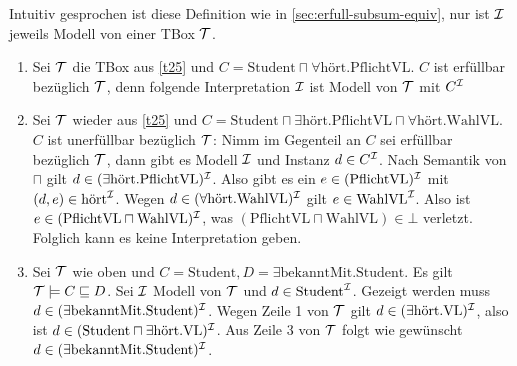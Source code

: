 Intuitiv gesprochen ist diese Definition wie in
\autoref{sec:erfull-subsum-equiv}, nur ist $\mathcal{I}$ jeweils Modell von einer TBox
$\mathcal{T}$.

\begin{tafel}\mbox{}
    \begin{enumerate}[label=\alph*)]
    \item Sei $\mathcal{T}$ die TBox aus \autoref{t25} und $C = \text{Student} \sqcap \forall \text{hört}.\text{PflichtVL}$. $C$ ist erfüllbar bezüglich $\mathcal{T}$, denn folgende Interpretation $\mathcal{I}$ ist Modell von $\mathcal{T}$ mit $C^{\mathcal{I}}$
    \begin{center}
    \end{center}
\item Sei $\mathcal{T}$ wieder aus \autoref{t25} und $C = \text{Student} \sqcap \exists \text{hört}.\text{PflichtVL} \sqcap \forall \text{hört}.\text{WahlVL}$.
    $C$ ist unerfüllbar bezüglich $\mathcal{T}$: Nimm im Gegenteil an $C$ sei erfüllbar bezüglich $\mathcal{T}$, dann gibt es Modell $\mathcal{I}$ und Instanz $d\in C^{\mathcal{I}}$. Nach Semantik von $\sqcap$ gilt $d \in (\exists \text{hört}.\text{PflichtVL})^{\mathcal{I}}$. Also gibt es ein $e \in (\text{PflichtVL})^{\mathcal{I}}$ mit $(d, e) \in \text{hört}^{\mathcal{I}}$. Wegen $d \in (\forall \text{hört}.\text{WahlVL})^{\mathcal{I}}$ gilt $e \in \text{WahlVL}^{\mathcal{I}}$. Also ist $e \in (\text{PflichtVL} \sqcap \text{WahlVL})^{\mathcal{I}}$, was $(\text{PflichtVL} \sqcap \text{WahlVL}) \in \bot$ verletzt. Folglich kann es keine Interpretation geben.
\item Sei $\mathcal{T}$ wie oben und $C = \text{Student}, D = \exists \text{bekanntMit}.\text{Student}$. Es gilt $\mathcal{T} \models C \sqsubseteq D$. Sei $\mathcal{I}$ Modell von $\mathcal{T}$ und $d \in \text{Student}^{\mathcal{I}}$. Gezeigt werden muss $d \in (\exists \text{bekanntMit}.\text{Student})^{\mathcal{I}}$. Wegen Zeile 1 von $\mathcal{T}$ gilt $d \in (\exists \text{hört}.\text{VL})^{\mathcal{I}}$, also ist $d \in (\text{Student} \sqcap \exists \text{hört}.\text{VL})^{\mathcal{I}}$. Aus Zeile 3 von $\mathcal{T}$ folgt wie gewünscht $d \in (\exists \text{bekanntMit}.\text{Student})^{\mathcal{I}}$.
    \end{enumerate}
\end{tafel}

